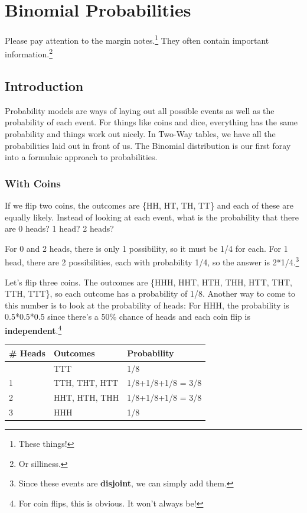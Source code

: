 \documentclass[
  letterpaper,
  DIV=11,
  numbers=noendperiod,
  oneside]{scrreprt}
\begin{document}
\hypertarget{binomial-probabilities}{%
\chapter{Binomial Probabilities}\label{binomial-probabilities}}

Please pay attention to the margin notes.\footnote{These things!} They
often contain important information.\footnote{Or silliness.}

\hypertarget{introduction-3}{%
\section{Introduction}\label{introduction-3}}

Probability models are ways of laying out all possible events as well as
the probability of each event. For things like coins and dice,
everything has the same probability and things work out nicely. In
Two-Way tables, we have all the probabilities laid out in front of us.
The Binomial distribution is our first foray into a formulaic approach
to probabilities.

\hypertarget{with-coins}{%
\subsection{With Coins}\label{with-coins}}

If we flip two coins, the outcomes are \{HH, HT, TH, TT\} and each of
these are equally likely. Instead of looking at each event, what is the
probability that there are 0 heads? 1 head? 2 heads?

For 0 and 2 heads, there is only 1 possibility, so it must be 1/4 for
each. For 1 head, there are 2 possibilities, each with probability 1/4,
so the answer is 2*1/4.\footnote{Since these events are
  \textbf{disjoint}, we can simply add them.}

Let's flip three coins. The outcomes are \{HHH, HHT, HTH, THH, HTT, THT,
TTH, TTT\}, so each outcome has a probability of 1/8. Another way to
come to this number is to look at the probability of heads: For HHH, the
probability is 0.5*0.5*0.5 since there's a 50\% chance of heads and each
coin flip is \textbf{independent}.\footnote{For coin flips, this is
  obvious. It won't always be!}

\begin{longtable}[]{@{}lll@{}}
\toprule\noalign{}
\# Heads & Outcomes & Probability \\
\midrule\noalign{}
\endhead
\bottomrule\noalign{}
\endlastfoot
0 & TTT & 1/8 \\
1 & TTH, THT, HTT & 1/8+1/8+1/8 = 3/8 \\
2 & HHT, HTH, THH & 1/8+1/8+1/8 = 3/8 \\
3 & HHH & 1/8 \\
\end{longtable}
\end{document}
